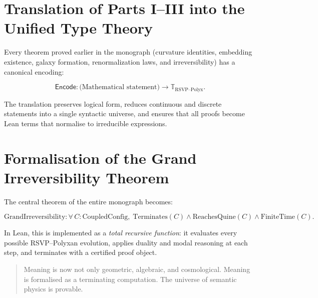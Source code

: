 \section{Translation of Parts I--III into the Unified Type Theory}

Every theorem proved earlier in the monograph
(curvature identities, embedding existence, galaxy formation, renormalization laws, and irreversibility)
has a canonical encoding:

\[
\mathsf{Encode} :
\text{(Mathematical statement)}\longrightarrow
\mathbb{T}_{\mathrm{RSVP\text{--}Polyx}}.
\]

The translation preserves logical form, reduces continuous and discrete statements
into a single syntactic universe, and ensures that all proofs become Lean terms
that normalise to irreducible expressions.

\section{Formalisation of the Grand Irreversibility Theorem}

The central theorem of the entire monograph becomes:

\[
\mathrm{GrandIrreversibility} :
  \forall\,C:\mathrm{CoupledConfig},\;
  \mathrm{Terminates}(C) \wedge
  \mathrm{ReachesQuine}(C) \wedge
  \mathrm{FiniteTime}(C).
\]

In Lean, this is implemented as a \emph{total recursive function}:
it evaluates every possible RSVP--Polyxan evolution,
applies duality and modal reasoning at each step,
and terminates with a certified proof object.

\bigskip

\begin{quote}
Meaning is now not only geometric, algebraic, and cosmological.  
Meaning is formalised as a terminating computation.  
The universe of semantic physics is provable.
\end{quote}

